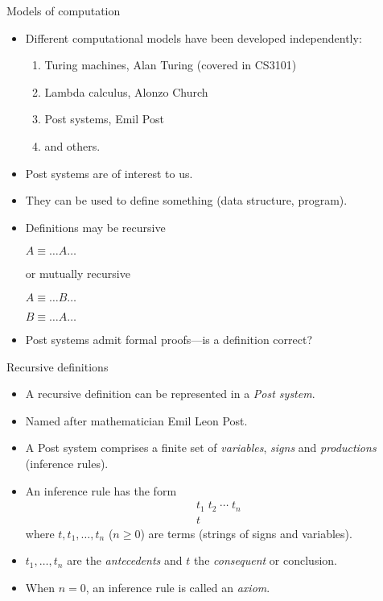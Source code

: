 \begin{wideslide}[bm=,toc=]{Models of computation}
\begin{itemize}
\item Different computational models have been developed independently:
\begin{enumerate}
\item Turing machines, Alan Turing (covered in CS3101)
\item Lambda calculus, Alonzo Church
\item Post systems, Emil Post
\item and others.
\end{enumerate}
\item Post systems are of interest to us.
\item They can be used to define something (data structure, program).
\item Definitions may be recursive 

\hspace{2em}$A \equiv \ldots A\ldots$

or mutually recursive

\hspace{2em}$A \equiv \ldots B\ldots$

\hspace{2em}$B \equiv \ldots A\ldots$

\item Post systems admit formal proofs---is a definition correct?
\end{itemize}
\end{wideslide}

\begin{wideslide}[bm=,toc=]{Recursive definitions}
\begin{itemize}
\item A recursive definition can be represented in a {\em Post system\/}.
\item Named after mathematician Emil Leon Post.
\item A Post system comprises a finite set of {\em variables\/}, {\em signs\/} and {\em productions\/} 
(inference rules).
\item An inference rule has the form
\begin{displaymath}
\begin{array}{c}
t_1\;t_2\;\cdots\;t_n\\
\hline
t
\end{array}
\end{displaymath}
where $t,t_1,\ldots ,t_n$ ($n\geq 0$) are terms (strings of signs and variables).
\item $t_1,\ldots , t_n$ are the {\em antecedents\/} and $t$ the {\em consequent\/} or conclusion.
\item When $n=0$, an inference rule is called an {\em axiom\/}.
\end{itemize}
\end{wideslide}

